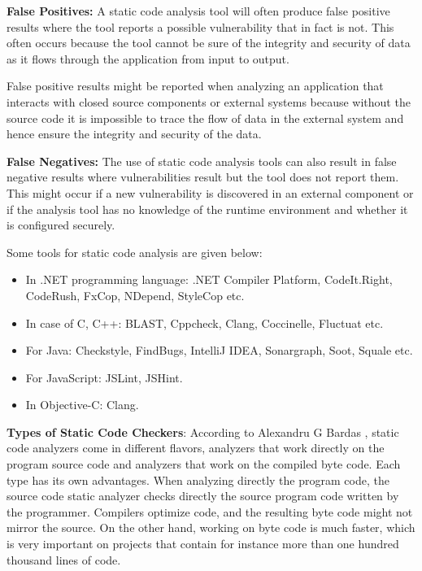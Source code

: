 \textbf{False Positives:}
A static code analysis tool will often produce false positive results where the tool reports a possible vulnerability that in fact is not. This often occurs because the tool cannot be sure of the integrity and security of data as it flows through the application from input to output.

False positive results might be reported when analyzing an application that interacts with closed source components or external systems because without the source code it is impossible to trace the flow of data in the external system and hence ensure the integrity and security of the data.

\textbf{False Negatives:}
The use of static code analysis tools can also result in false negative results where vulnerabilities result but the tool does not report them. This might occur if a new vulnerability is discovered in an external component or if the analysis tool has no knowledge of the runtime environment and whether it is configured securely.

Some tools for static code analysis are given below:
\begin{itemize}
	\item In .NET programming language: .NET Compiler Platform, CodeIt.Right, CodeRush, FxCop, NDepend, StyleCop etc.
	\item In case of C, C++: BLAST, Cppcheck, Clang, Coccinelle, Fluctuat etc.  
	\item For Java: Checkstyle, FindBugs, IntelliJ IDEA, Sonargraph, Soot, Squale etc.
	\item For JavaScript: JSLint, JSHint. 
	\item In Objective-C: Clang.
\end{itemize}

\textbf{Types of Static Code Checkers}: According to Alexandru G Bardas \cite{ref_91_bardas2010static}, static code analyzers come in different flavors, analyzers that work directly on the
program source code and analyzers that work on the compiled byte code. Each type has its own advantages. When analyzing directly the program code, the source code static analyzer checks directly the source program code written by the programmer. Compilers optimize code, and the resulting byte code might not mirror the source. On the other hand, working on byte code is much faster, which is very important on
projects that contain for instance more than one hundred thousand lines of code.


